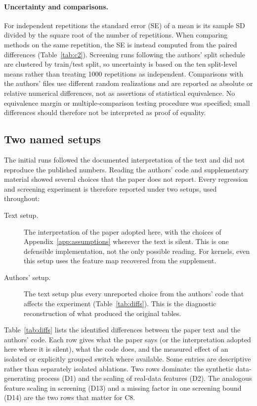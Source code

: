 \paragraph{Uncertainty and comparisons.} For independent repetitions the standard error (SE) of a mean is its sample SD divided by the square root of the number of repetitions. When comparing methods on the same repetition, the SE is instead computed from the paired differences (Table~\ref{tab:c2}). Screening runs following the authors' split schedule are clustered by train/test split, so uncertainty is based on the ten split-level means rather than treating 1000 repetitions as independent. Comparisons with the authors' files use different random realizations and are reported as absolute or relative numerical differences, not as assertions of statistical equivalence. No equivalence margin or multiple-comparison testing procedure was specified; small differences should therefore not be interpreted as proof of equality.

\subsection{Two named setups}
\label{sec:setups}

The initial runs followed the documented interpretation of the text and did not reproduce the published numbers. Reading the authors' code
and supplementary material showed several choices that the paper does not report. Every regression and screening experiment is therefore reported
under two setups, used throughout:

\begin{description}
\item[Text setup.] The interpretation of the paper adopted here, with the choices of Appendix~\ref{app:assumptions} wherever the text is silent. This is one defensible implementation, not the only possible reading. For kernels, even this setup uses the feature map recovered from the supplement.
\item[Authors' setup.] The text setup plus every unreported choice from the authors' code that affects the
  experiment (Table~\ref{tab:diffs}). This is the diagnostic reconstruction of what produced the original tables.
\end{description}

Table~\ref{tab:diffs} lists the identified differences between the paper text and the authors' code. Each row gives
what the paper says (or the interpretation adopted here where it is silent), what the code does, and the measured effect of an isolated or explicitly grouped switch where available. Some entries are descriptive rather than separately isolated ablations. Two rows dominate: the synthetic data-generating process
(D1) and the scaling of real-data features (D2). The analogous feature scaling in screening (D13) and a missing
factor in one screening bound (D14) are the two rows that matter for C8.

